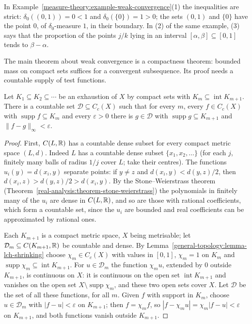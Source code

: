 In Example~\ref{measure-theory:example-weak-convergence}(1) the inequalities are strict: $\delta_0((0, 1)) = 0 < 1$ and $\delta_0(\{0\}) = 1 > 0$; the sets $(0, 1)$ and $\{0\}$ have the point $0$, of
$\delta_0$-measure $1$, in their boundary. In (2) of the same example, (3) says that the proportion of the points $j/k$ lying in an interval $[\alpha, \beta] \subseteq [0, 1]$ tends to $\beta - \alpha$.

The main theorem about weak convergence is a compactness theorem: bounded mass on compact sets suffices for a convergent subsequence. Its proof needs a countable supply of test functions.

\begin{lemma}\label{measure-theory:lemma-cc-separable}
Let $K_1 \subseteq K_2 \subseteq \cdots$ be an exhaustion of $X$ by compact sets with $K_m \subseteq \operatorname{int}K_{m+1}$. There is a countable set $\mathcal{D} \subseteq C_c(X)$ such that for every
$m$, every $f \in C_c(X)$ with $\operatorname{supp}f \subseteq K_m$ and every $\varepsilon > 0$ there is $g \in \mathcal{D}$ with $\operatorname{supp}g \subseteq K_{m+1}$ and $\|f - g\|_\infty < \varepsilon$.
\end{lemma}

\begin{proof}
First, $C(L, \mathbb{R})$ has a countable dense subset for every compact metric space $(L, d)$. Indeed $L$ has a countable dense subset $\{x_1, x_2, \ldots\}$ (for each $j$, finitely many balls of radius $1/j$
cover $L$; take their centres). The functions $u_i(y) = d(x_i, y)$ separate points: if $y \neq z$ and $d(x_i, y) < d(y, z)/2$, then $d(x_i, z) > d(y, z)/2 > d(x_i, y)$. By the Stone--Weierstrass theorem
(Theorem~\ref{real-analysis:theorem-stone-weierstrass}) the polynomials in finitely many of the $u_i$ are dense in $C(L, \mathbb{R})$, and so are those with rational coefficients, which form a countable set, since
the $u_i$ are bounded and real coefficients can be approximated by rational ones.

Each $K_{m+1}$ is a compact metric space, $X$ being metrisable; let $\mathcal{D}_m \subseteq C(K_{m+1}, \mathbb{R})$ be countable and dense. By Lemma~\ref{general-topology:lemma-lch-shrinking} choose
$\chi_m \in C_c(X)$ with values in $[0, 1]$, $\chi_m = 1$ on $K_m$ and $\operatorname{supp}\chi_m \subseteq \operatorname{int}K_{m+1}$. For $u \in \mathcal{D}_m$ the function $\chi_mu$, extended by $0$
outside $K_{m+1}$, is continuous on $X$: it is continuous on the open set $\operatorname{int}K_{m+1}$ and vanishes on the open set $X \setminus \operatorname{supp}\chi_m$, and these two open sets cover $X$.
Let $\mathcal{D}$ be the set of all these functions, for all $m$. Given $f$ with support in $K_m$, choose $u \in \mathcal{D}_m$ with $|f - u| < \varepsilon$ on $K_{m+1}$; then $f = \chi_mf$, so
$|f - \chi_mu| = \chi_m|f - u| < \varepsilon$ on $K_{m+1}$, and both functions vanish outside $K_{m+1}$.
\end{proof}

